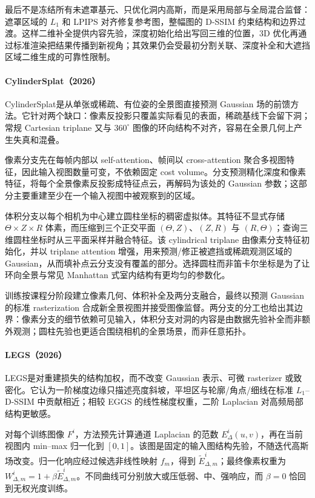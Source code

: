 最后不是冻结所有未遮罩基元、只优化洞内高斯，而是采用局部与全局混合监督：遮罩区域的 $L_1$ 和 LPIPS 对齐修复参考图，整幅图的 D-SSIM 约束结构和边界过渡。这样二维补全提供内容先验，深度初始化给出写回三维的位置，3D 优化再通过标准渲染把结果传播到新视角；其效果仍会受最初分割关联、深度补全和大遮挡区域二维生成的可靠性限制。

\paragraph{CylinderSplat（2026）\cite{2603_05882}}
CylinderSplat是从单张或稀疏、有位姿的全景图直接预测 Gaussian 场的前馈方法。它针对两个缺口：像素反投影只覆盖实际看见的表面，稀疏基线下会留下洞；常规 Cartesian triplane 又与 $360^\circ$ 图像的环向结构不对齐，容易在全景几何上产生失真和混叠。

像素分支先在每帧内部以 self-attention、帧间以 cross-attention 聚合多视图特征，因此输入视图数量可变，不依赖固定 cost volume。分支预测精化深度和像素特征，将每个全景像素反投影成特征点云，再解码为该处的 Gaussian 参数；这部分主要重建至少在一个输入视图中被观察到的区域。

体积分支以每个相机为中心建立圆柱坐标的稠密虚拟体。其特征不显式存储 $\Theta\times Z\times R$ 体素，而压缩到三个正交平面 $(\Theta,Z)$、$(Z,R)$ 与 $(R,\Theta)$；查询三维圆柱坐标时从三平面采样并融合特征。该 cylindrical triplane 由像素分支特征初始化，并以 triplane attention 增强，用来预测/修正被遮挡或稀疏观测区域的 Gaussian，从而填补点云分支没有覆盖的部分。选择圆柱而非笛卡尔坐标是为了让环向全景与常见 Manhattan 式室内结构有更均匀的参数化。

训练按课程分阶段建立像素几何、体积补全及两分支融合，最终以预测 Gaussian 的标准 rasterization 合成新全景视图并接受图像监督。两分支的分工也给出其边界：像素分支的细节依赖可见输入，体积分支对洞的内容是由数据先验补全而非额外观测；圆柱先验也更适合围绕相机的全景场景，而非任意拓扑。

\paragraph{LEGS（2026）\cite{2606_07932}}
LEGS是对重建损失的结构加权，而不改变 Gaussian 表示、可微 rasterizer 或致密化。它认为一阶梯度边缘只描述亮度斜坡，平坦区与轮廓/角点/细线在标准 $L_1$--D-SSIM 中贡献相近；相较 EGGS 的线性梯度权重，二阶 Laplacian 对高频局部结构更敏感。

对每个训练图像 $F^i$，方法预先计算通道 Laplacian 的范数 $E^i_\Delta(u,v)$，再在当前视图内 min--max 归一化到 $[0,1]$。该图是固定的输入图结构先验，不随迭代高斯场改变。归一化响应经过候选非线性映射 $f_m$，得到 $\tilde E^i_{\Delta,m}$；最终像素权重为 $W^i_{\Delta,m}=1+\beta\tilde E^i_{\Delta,m}$。不同曲线可分别放大或压低弱、中、强响应，而 $\beta=0$ 恰回到无权光度训练。

